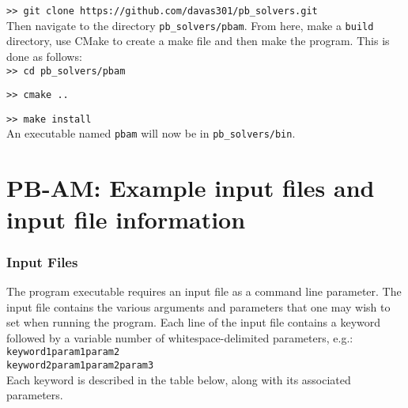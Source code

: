 \hspace{1cm}\texttt{>> git clone https://github.com/davas301/pb\_solvers.git} \\

Then navigate to the directory \texttt{pb\_solvers/pbam}. From here, make a \texttt{build} directory, use CMake to create a make file and then make the program.  This is done as follows: \\

\hspace{1cm}\texttt{>> cd pb\_solvers/pbam} 

\hspace{1cm}\texttt{>> cmake ..} 

\hspace{1cm}\texttt{>> make install} \\


An executable named \texttt{pbam} will now be in \texttt{pb\_solvers/bin}.

\section{PB-AM: Example input files and input file information}

\subsubsection{Input Files}

The program executable requires an input file as a command line parameter. The input file contains the various arguments and parameters that one may wish to set when running the program. Each line of the input file contains a keyword followed by a variable number of whitespace-delimited parameters, e.g.: \\

\texttt{keyword1\qquad param1\qquad param2} \\
\texttt{keyword2\qquad param1\qquad param2\qquad param3} \\

Each keyword is described in the table below, along with its associated parameters.


\newcommand{\param}[1]{$\textless\texttt{#1}\textgreater$}
\newcommand\T{\rule{0pt}{3.5ex}}       %
\newcommand\B{\rule[-2ex]{0pt}{0pt}}

\newlength{\colthree}
\setlength{\colthree}{10.1cm}
\newlength{\coltwo}
\setlength{\coltwo}{2.9cm}

